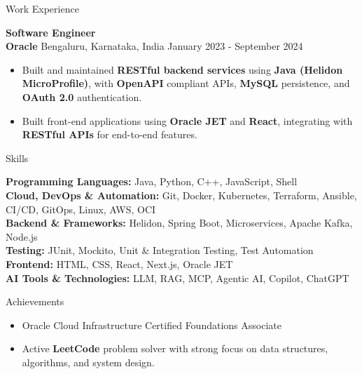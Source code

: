 \documentclass{resume}
\begin{document}
\begin{rSection}{Work Experience}
\vspace{6pt}

\textbf{Software Engineer} \\
\textbf{Oracle} \textbar{} Bengaluru, Karnataka, India \hspace*{\fill} January 2023 - September 2024
\vspace{-2pt}
\begin{itemize}
    \item Built and maintained \textbf{RESTful backend services} using \textbf{Java (Helidon MicroProfile)}, with \textbf{OpenAPI} compliant APIs, \textbf{MySQL} persistence, and \textbf{OAuth 2.0} authentication.
    \item Built front-end applications using \textbf{Oracle JET} and \textbf{React}, integrating with \textbf{RESTful APIs} for end-to-end features.
\end{itemize}

\end{rSection}

\begin{rSection}{Skills}

\vspace{-2pt}
\textbf{Programming Languages:} Java, Python, C++, JavaScript, Shell \\
\textbf{Cloud, DevOps \& Automation:} Git, Docker, Kubernetes, Terraform, Ansible, CI/CD, GitOps, Linux, AWS, OCI \\
\textbf{Backend \& Frameworks:} Helidon, Spring Boot, Microservices, Apache Kafka, Node.js \\
\textbf{Testing:} JUnit, Mockito, Unit \& Integration Testing, Test Automation \\
\textbf{Frontend:} HTML, CSS, React, Next.js, Oracle JET \\
\textbf{AI Tools \& Technologies:} LLM, RAG, MCP, Agentic AI, Copilot, ChatGPT

\end{rSection}

\begin{rSection}{Achievements}

\begin{itemize}
    \item Oracle Cloud Infrastructure Certified Foundations Associate
    \item Active \textbf{LeetCode} problem solver with strong focus on data structures, algorithms, and system design.
\end{itemize}

\end{rSection}
\end{document}
